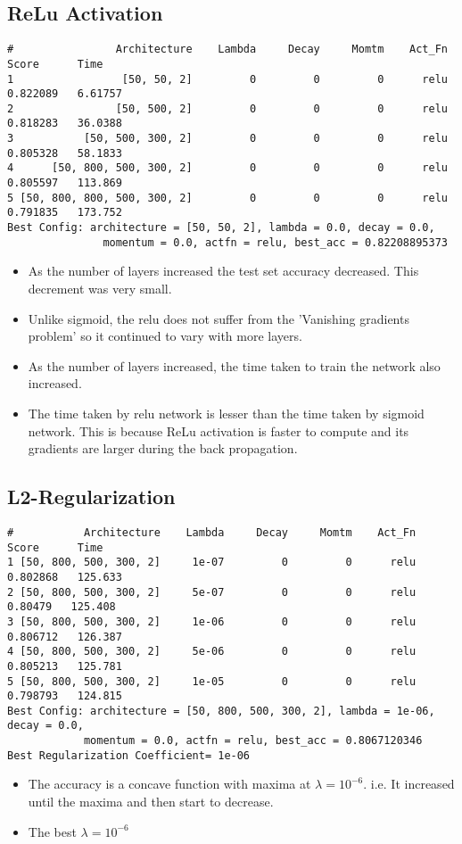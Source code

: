 \documentclass[letter,doc,notimes]{article}
\begin{document}
\subsection{ReLu Activation}
\begin{verbatim}
#                Architecture    Lambda     Decay     Momtm    Act_Fn     Score      Time
1                 [50, 50, 2]         0         0         0      relu  0.822089   6.61757
2                [50, 500, 2]         0         0         0      relu  0.818283   36.0388
3           [50, 500, 300, 2]         0         0         0      relu  0.805328   58.1833
4      [50, 800, 500, 300, 2]         0         0         0      relu  0.805597   113.869
5 [50, 800, 800, 500, 300, 2]         0         0         0      relu  0.791835   173.752
Best Config: architecture = [50, 50, 2], lambda = 0.0, decay = 0.0, 
               momentum = 0.0, actfn = relu, best_acc = 0.82208895373
\end{verbatim}
\begin{itemize}
	\item As the number of layers increased the test set accuracy decreased. This decrement was very small.
	\item Unlike sigmoid, the relu does not suffer from the 'Vanishing gradients problem' so it continued to vary with more layers.
	\item As the number of layers increased, the time taken to train the network also increased.
	\item The time taken by relu network is lesser than the time taken by sigmoid network. This is because ReLu activation is faster to compute and its gradients are larger during the back propagation.
\end{itemize}

\subsection{L2-Regularization}
\begin{verbatim}
#           Architecture    Lambda     Decay     Momtm    Act_Fn     Score      Time
1 [50, 800, 500, 300, 2]     1e-07         0         0      relu  0.802868   125.633
2 [50, 800, 500, 300, 2]     5e-07         0         0      relu   0.80479   125.408
3 [50, 800, 500, 300, 2]     1e-06         0         0      relu  0.806712   126.387
4 [50, 800, 500, 300, 2]     5e-06         0         0      relu  0.805213   125.781
5 [50, 800, 500, 300, 2]     1e-05         0         0      relu  0.798793   124.815
Best Config: architecture = [50, 800, 500, 300, 2], lambda = 1e-06, decay = 0.0,
            momentum = 0.0, actfn = relu, best_acc = 0.8067120346
Best Regularization Coefficient= 1e-06
\end{verbatim}
\begin{itemize}
	\item The accuracy is a concave function with maxima at $\lambda = 10^{-6 } $. i.e. It increased until the maxima and then start to decrease.
	\item The best $\lambda = 10^{-6 }$
\end{itemize}
\end{document}
